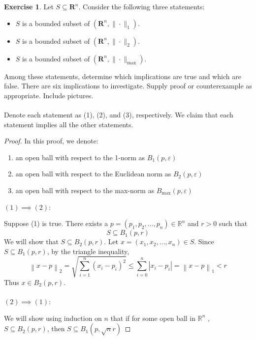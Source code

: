 \documentclass{article}
\newcommand{\R}{\mathbf{R}}
\theoremstyle{plain} %
\numberwithin{thm}{section} %
\theoremstyle{definition}
\newtheorem{exercise}[thm]{Exercise} %
\begin{document}
    \begin{exercise}
        Let $S\subseteq \R^n$. Consider the following three statements:
        \begin{itemize}
            \item $S$ is a bounded subset of $(\R^n,\|\cdot\|_1)$.
            \item $S$ is a bounded subset of $(\R^n,\|\cdot\|_2)$.
            \item $S$ is a bounded subset of $(\R^n,\|\cdot\|_{\max})$.
        \end{itemize}
        Among these statements, determine which implications are true and which are false. There are six implications to investigate. Supply proof or counterexample as appropriate. Include pictures.
        \\\\
        \noindent Denote each statement as (1), (2), and (3), respectively. We claim that each statement implies all the other statements.
        \begin{proof}
            In this proof, we denote:
            \begin{enumerate}
                \item an open ball with respect to the 1-norm as \(B_1(p, \varepsilon )\)
                \item an open ball with respect to the Euclidean norm as \(B_2(p, \varepsilon )\) 
                \item an open ball with respect to the max-norm as \(B_{\text{max} } (p, \varepsilon )\)  
            \end{enumerate}
            \((1) \implies (2)\):

            Suppose (1) is true. There exists a \(p = (p_1, p_2, \dots, p_n) \in \mathbb{R}^n\) and \(r > 0\) such that
            \[
                S \subseteq B_1(p, r)
            \] 
            We will show that \(S \subseteq B_2(p, r)\). Let \(x = (x_1, x_2, \dots, x_n) \in S\). Since \(S \subseteq B_1(p, r)\), by the triangle inequality,
            \[
                \left\lVert x - p \right\rVert _2 = \sqrt{\sum_{i=1}^{n} (x_i - p_i)^2} \leq \sum_{i=0}^n \left\vert x_i - p_i \right\vert  = \left\lVert x - p \right\rVert _1 < r
            \]
            Thus \(x \in B_2(p, r)\).
            \\\\
            \((2) \implies (1)\):
            
            We will show using induction on \(n\) that if for some open ball in \(\mathbb{R} ^n\) , \(S \subseteq B_2(p, r)\),  then \(S \subseteq B_1(p, \sqrt{n} r )\) 


\end{proof}
\end{exercise}
\end{document}

